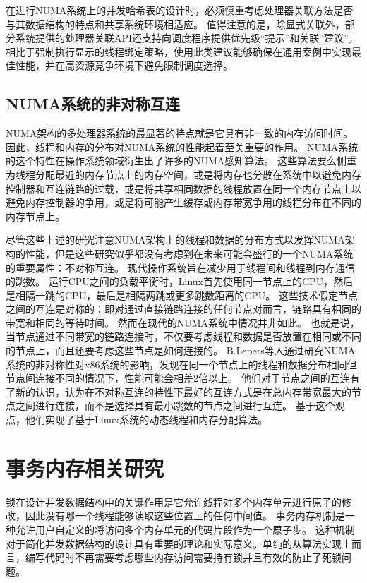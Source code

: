 在进行NUMA系统上的并发哈希表的设计时，必须慎重考虑处理器关联方法是否与其数据结构的特点和共享系统环境相适应。 
值得注意的是，除显式关联外，部分系统提供的处理器关联API还支持向调度程序提供优先级“提示”和关联“建议”。 相比于强制执行显示的线程绑定策略，使用此类建议能够确保在通用案例中实现最佳性能，并在高资源竞争环境下避免限制调度选择\cite{majo2017library}。

\subsection{NUMA系统的非对称互连}
\label{sec:}
NUMA架构的多处理器系统的最显著的特点就是它具有非一致的内存访问时间。
因此，线程和内存的分布对NUMA系统的性能起着至关重要的作用。
NUMA系统的这个特性在操作系统领域衍生出了许多的NUMA感知算法。
这些算法要么侧重为线程分配最近的内存节点上的内存空间\cite{brecht1993importance,lachaize2012memprof,dashti2013traffic}，或是将内存也分散在系统中以避免内存控制器和互连链路的过载\cite{dashti2013traffic}，或是将共享相同数据的线程放置在同一个内存节点上\cite{tam2007thread,tang2013optimizing}以避免内存控制器的争用\cite{bull2002data,blagodurov2010case,tang2013optimizing}，或是将可能产生缓存或内存带宽争用的线程分布在不同的内存节点上。

尽管这些上述的研究注意NUMA架构上的线程和数据的分布方式以发挥NUMA架构的性能，但是这些研究似乎都没有考虑到在未来可能会盛行的一个NUMA系统的重要属性：不对称互连。
现代操作系统旨在减少用于线程间和线程到内存通信的跳数。
运行CPU之间的负载平衡时，Linux首先使用同一节点上的CPU，然后是相隔一跳的CPU，最后是相隔两跳或更多跳数距离的CPU。
这些技术假定节点之间的互连是对称的：即对通过直接链路连接的任何节点对而言，链路具有相同的带宽和相同的等待时间。
然而在现代的NUMA系统中情况并非如此。
也就是说，当节点通过不同带宽的链路连接时，不仅要考虑线程和数据是否放置在相同或不同的节点上，而且还要考虑这些节点是如何连接的。
B.Lepers\cite{lepers2015thread}等人通过研究NUMA系统的非对称性对x86系统的影响，发现在同一个节点上的线程和数据分布相同但节点间连接不同的情况下，性能可能会相差2倍以上。
他们对于节点之间的互连有了新的认识，认为在不对称互连的特性下最好的互连方式是在总内存带宽最大的节点之间进行连接，而不是选择具有最小跳数的节点之间进行互连。
基于这个观点，他们实现了基于Linux系统的动态线程和内存分配算法\cite{lepers2015thread}。


\section{事务内存相关研究}
锁在设计并发数据结构中的关键作用是它允许线程对多个内存单元进行原子的修改，因此没有哪一个线程能够读取这些位置上的任何中间值。
事务内存机制是一种允许用户自定义的将访问多个内存单元的代码片段作为一个原子步\cite{moir2004concurrent}。
这种机制对于简化并发数据结构的设计具有重要的理论和实际意义。单纯的从算法实现上而言，编写代码时不再需要考虑哪些内存访问需要持有锁并且有效的防止了死锁问题。

